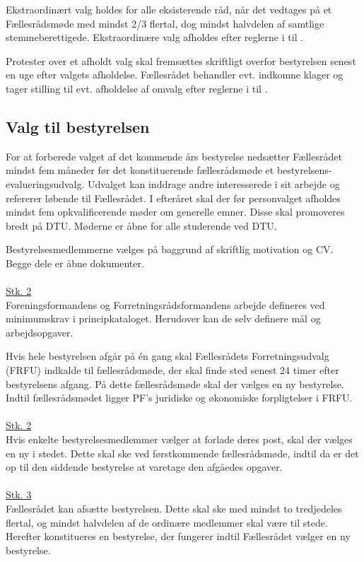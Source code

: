 \begin{list}
\item Ekstraordinært valg holdes for alle eksisterende råd, når det vedtages på et Fællesrådsmøde med mindst 2/3 flertal, dog mindst halvdelen af samtlige stemmeberettigede. Ekstraordinære valg afholdes efter reglerne i  til .

\item Protester over et afholdt valg skal fremsættes skriftligt overfor bestyrelsen senest en uge efter valgets afholdelse. Fællesrådet behandler evt. indkomne klager og tager stilling til evt. afholdelse af omvalg efter reglerne i  til .


\subsection{Valg til bestyrelsen} \label{kap:ValgTilBestyrelsen}
\item \label{S:bestyrelsen:BXX-eu valg} For at forberede valget af det kommende års bestyrelse nedsætter Fællesrådet mindst fem måneder før det konstituerende fællesrådsmøde et bestyrelsens-evalueringsudvalg. Udvalget kan inddrage andre interesserede i sit arbejde og refererer løbende til Fællesrådet. I efteråret skal der før personvalget afholdes mindst fem opkvalificerende møder om generelle emner. Disse skal promoveres bredt på DTU. Møderne er åbne for alle studerende ved DTU.

\item Bestyrelsesmedlemmerne vælges på baggrund af skriftlig motivation og CV. Begge dele er åbne dokumenter.\\
\\
\underline{Stk. 2}\\
Foreningsformandens og Forretningsrådsformandens arbejde defineres ved minimumskrav i principkataloget. Herudover kan de selv definere mål og arbejdsopgaver.\\

\item Hvis hele bestyrelsen afgår på én gang skal Fællesrådets Forretningsudvalg (FRFU) indkalde til fællesrådsmøde, der skal finde sted senest 24 timer efter bestyrelsens afgang. På dette fællesrådsmøde skal der vælges en ny bestyrelse. Indtil fællesrådsmødet ligger PF's juridiske og økonomiske forpligtelser i FRFU.\\
\\
\underline{Stk. 2}\\
Hvis enkelte bestyrelsesmedlemmer vælger at forlade deres post, skal der vælges en ny i stedet. Dette skal ske ved førstkommende fællesrådsmøde, indtil da er det op til den siddende bestyrelse at varetage den afgåedes opgaver.\\
\\
\underline{Stk. 3}\\
Fællesrådet kan afsætte bestyrelsen. Dette skal ske med mindst to tredjedeles flertal, og mindst halvdelen af de ordinære medlemmer skal være til stede. Herefter konstitueres en bestyrelse, der fungerer indtil Fællesrådet vælger en ny bestyrelse.


\end{list}
